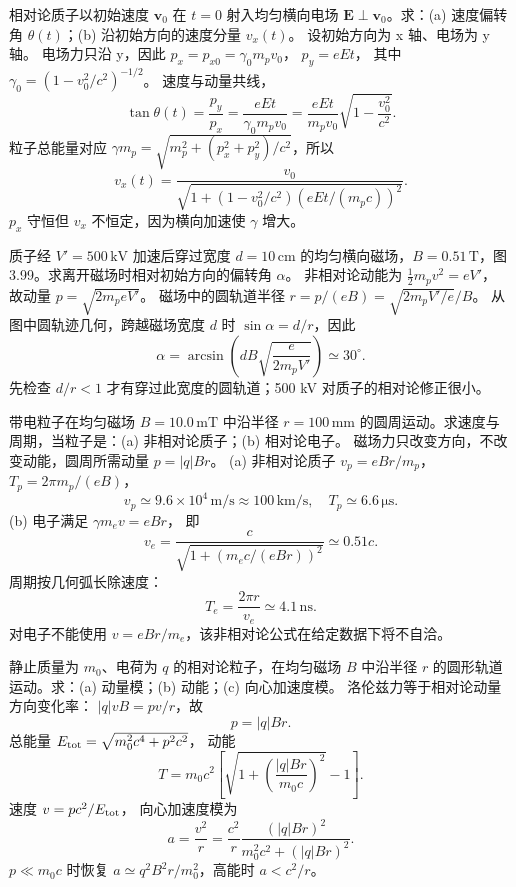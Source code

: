 相对论质子以初始速度 $\bm v_0$ 在 $t=0$ 射入均匀横向电场 $\bm E\perp\bm v_0$。求：(a) 速度偏转角 $\theta(t)$；(b) 沿初始方向的速度分量 $v_x(t)$。
\exsolution
设初始方向为 x 轴、电场为 y 轴。
电场力只沿 y，因此
$p_x=p_{x0}=\gamma_0m_pv_0$，
$p_y=eEt$，
其中 $\gamma_0=(1-v_0^2/c^2)^{-1/2}$。
速度与动量共线，
\[
\boxed{\tan\theta(t)=\frac{p_y}{p_x}
=\frac{eEt}{\gamma_0m_pv_0}
=\frac{eEt}{m_pv_0}
\sqrt{1-\frac{v_0^2}{c^2}}}.
\]
粒子总能量对应
$\gamma m_p=\sqrt{m_p^2+(p_x^2+p_y^2)/c^2}$，所以
\[
\boxed{v_x(t)=
\frac{v_0}{\sqrt{1+
(1-v_0^2/c^2)(eEt/(m_pc))^2}}}.
\]
\excheck $p_x$ 守恒但 $v_x$ 不恒定，因为横向加速使 $\gamma$ 增大。

质子经 $V'=500\,\mathrm{kV}$ 加速后穿过宽度 $d=10\,\mathrm{cm}$ 的均匀横向磁场，$B=0.51\,\mathrm T$，图3.99。求离开磁场时相对初始方向的偏转角 $\alpha$。
\exsolution
非相对论动能为
$\frac12m_pv^2=eV'$，
故动量
$p=\sqrt{2m_peV'}$。
磁场中的圆轨道半径
$r=p/(eB)=\sqrt{2m_pV'/e}/B$。
从图中圆轨迹几何，跨越磁场宽度 $d$ 时
$\sin\alpha=d/r$，因此
\[
\boxed{\alpha=
\arcsin\left(dB\sqrt{\frac{e}{2m_pV'}}\right)
\simeq30^\circ}.
\]
\excheck 先检查 $d/r<1$ 才有穿过此宽度的圆轨道；500 kV 对质子的相对论修正很小。

带电粒子在均匀磁场 $B=10.0\,\mathrm{mT}$ 中沿半径 $r=100\,\mathrm{mm}$ 的圆周运动。求速度与周期，当粒子是：(a) 非相对论质子；(b) 相对论电子。
\exsolution
磁场力只改变方向，不改变动能，圆周所需动量
$p=|q|Br$。
(a) 非相对论质子
$v_p=eBr/m_p$，
$T_p=2\pi m_p/(eB)$，
\[
\boxed{v_p\simeq9.6\times10^4\,\mathrm{m/s}
\approx100\,\mathrm{km/s}},\quad
\boxed{T_p\simeq6.6\,\mathrm{\mu s}}.
\]
(b) 电子满足
$\gamma m_ev=eBr$，
即
\[
\boxed{v_e=\frac c{\sqrt{1+(m_ec/(eBr))^2}}
\simeq0.51c}.
\]
周期按几何弧长除速度：
\[
\boxed{T_e=\frac{2\pi r}{v_e}\simeq4.1\,\mathrm{ns}}.
\]
\excheck 对电子不能使用 $v=eBr/m_e$，该非相对论公式在给定数据下将不自洽。

静止质量为 $m_0$、电荷为 $q$ 的相对论粒子，在均匀磁场 $B$ 中沿半径 $r$ 的圆形轨道运动。求：(a) 动量模；(b) 动能；(c) 向心加速度模。
\exsolution
洛伦兹力等于相对论动量方向变化率：
$|q|vB=pv/r$，故
\[
\boxed{p=|q|Br}.
\]
总能量
$E_{\rm tot}=\sqrt{m_0^2c^4+p^2c^2}$，
动能
\[
\boxed{T=
m_0c^2\left[\sqrt{1+
\left(\frac{|q|Br}{m_0c}\right)^2}-1\right]}.
\]
速度
$v=pc^2/E_{\rm tot}$，
向心加速度模为
\[
\boxed{a=\frac{v^2}{r}
=\frac{c^2}{r}
\frac{(|q|Br)^2}{m_0^2c^2+(|q|Br)^2}}.
\]
\excheck $p\ll m_0c$ 时恢复 $a\simeq q^2B^2r/m_0^2$，高能时 $a<c^2/r$。

